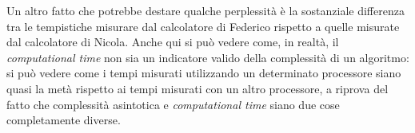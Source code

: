 Un altro fatto che potrebbe destare qualche perplessità è la sostanziale differenza tra le tempistiche misurare dal calcolatore di Federico rispetto a quelle misurate dal calcolatore di Nicola. Anche qui si può vedere come, in realtà, il \emph{computational time} non sia un indicatore valido della complessità di un algoritmo: si può vedere come i tempi misurati utilizzando un determinato processore siano quasi la metà rispetto ai tempi misurati con un altro processore, a riprova del fatto che complessità asintotica e \emph{computational time} siano due cose completamente diverse.
